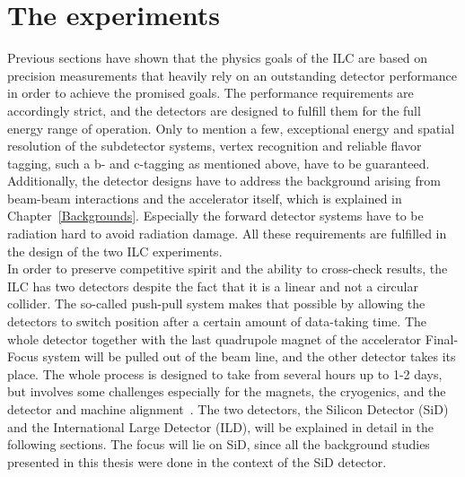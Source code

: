 \section{The experiments}
\label{ILC:detectors}
Previous sections have shown that the physics goals of the ILC are based on precision measurements that heavily rely on an outstanding detector performance in order to achieve the promised goals.
The performance requirements are accordingly strict, and the detectors are designed to fulfill them for the full energy range of operation.
Only to mention a few, exceptional energy and spatial resolution of the subdetector systems, vertex recognition and reliable flavor tagging, such a b- and c-tagging as mentioned above, have to be guaranteed. 
Additionally, the detector designs have to address the background arising from beam-beam interactions and the accelerator itself, which is explained in Chapter~\ref{Backgrounds}.
Especially the forward detector systems have to be radiation hard to avoid radiation damage.
All these requirements are fulfilled in the design of the two ILC experiments.
\\In order to preserve competitive spirit and the ability to cross-check results, the ILC has two detectors despite the fact that it is a linear and not a circular collider.
The so-called push-pull system makes that possible by allowing the detectors to switch position after a certain amount of data-taking time.
The whole detector together with the last quadrupole magnet of the accelerator Final-Focus system will be pulled out of the beam line, and the other detector takes its place.
The whole process is designed to take from several hours up to 1-2 days, but involves some challenges especially for the magnets, the cryogenics, and the detector and machine alignment~\cite[p. 28-29]{TDR1}.
The two detectors, the Silicon Detector (SiD) and the International Large Detector (ILD), will be explained in detail in the following sections.
The focus will lie on SiD, since all the background studies presented in this thesis were done in the context of the SiD detector.


